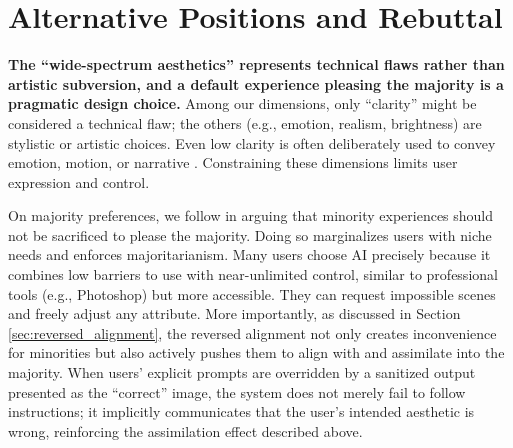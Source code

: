 \section{Alternative Positions and Rebuttal}


\textbf{The ``wide-spectrum aesthetics'' represents technical flaws rather than artistic subversion, and a default experience pleasing the majority is a pragmatic design choice.} Among our dimensions, only ``clarity'' might be considered a technical flaw; the others (e.g., emotion, realism, brightness) are stylistic or artistic choices. Even low clarity is often deliberately used to convey emotion, motion, or narrative \cite{stacey_hill_embracing_nodate}. Constraining these dimensions limits user expression and control. 

On majority preferences, we follow \citet{guo_position_2025} in arguing that minority experiences should not be sacrificed to please the majority. Doing so marginalizes users with niche needs and enforces majoritarianism. Many users choose AI precisely because it combines low barriers to use with near-unlimited control, similar to professional tools (e.g., Photoshop) but more accessible. They can request impossible scenes and freely adjust any attribute. More importantly, as discussed in Section \ref{sec:reversed_alignment}, the reversed alignment not only creates inconvenience for minorities but also actively pushes them to align with and assimilate into the majority. When users' explicit prompts are overridden by a sanitized output presented as the ``correct'' image, the system does not merely fail to follow instructions; it implicitly communicates that the user's intended aesthetic is wrong, reinforcing the assimilation effect described above.

